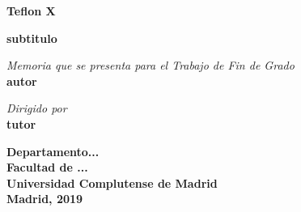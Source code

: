 \begin{titlepage}
\vspace{4cm}
\centering
{\textsf{\huge  \textbf{Teflon X}}}

\vspace{0.3cm}

{\textsf{\large \textbf{subtitulo} }}

\vspace{7cm}
\textit{Memoria que se presenta para el Trabajo de Fin de Grado}\\
\vspace{5mm}
{\large \textbf{ autor}}

\vspace{2cm}
\textit{Dirigido por}\\
\vspace{5mm}
{\bfseries tutor}

\vfill

\textbf{{Departamento...\\
Facultad de ...\\
Universidad Complutense de Madrid}}\\
\vspace{5mm}
\textbf{Madrid, 2019}
\end{titlepage}
\fantasma